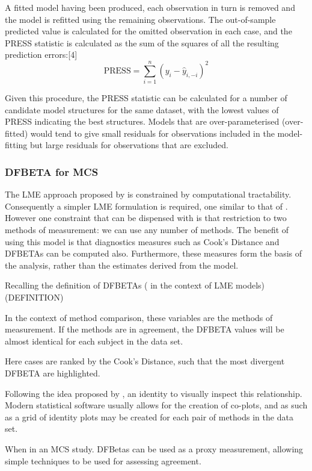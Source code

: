 \documentclass[12pt, a4paper]{report}
\theoremstyle{plain}
\theoremstyle{definition}
\theoremstyle{remark}
\begin{document}
	A fitted model having been produced, each observation in turn is removed and the model is refitted using the remaining observations. The out-of-sample predicted value is calculated for the omitted observation in each case, and the PRESS statistic is calculated as the sum of the squares of all the resulting prediction errors:[4]
	\[\mbox{PRESS} =\sum_{i=1}^n (y_i - \hat{y}_{i, -i})^2 \]

	Given this procedure, the PRESS statistic can be calculated for a number of candidate model structures for the same dataset, with the lowest values of PRESS indicating the best structures. Models that are over-parameterised (over-fitted) would tend to give small residuals for observations included in the model-fitting but large residuals for observations that are excluded.
	




	\subsubsection{DFBETA for MCS}
	The LME approach proposed by \citet{ARoy2009} is constrained by computational tractability.
	Consequently a simpler LME formulation is required, one similar to that of \citet{BXC2008}. However one constraint that can be dispensed with is that restriction to
	two methods of measurement: we can use any number of methods.
	The benefit of using this model is that diagnostics measures such as Cook's Distance and DFBETAs can be computed also. Furthermore, these measures
	form the basis of the analysis, rather than the estimates derived from the model.
	
	Recalling the definition of DFBETAs ( in the context of LME models) (DEFINITION)
	
	In the context of method comparison, these variables are the methods of measurement. If the methods are in agreement, the DFBETA values will be almost identical for each subject in
	the data set.
	
	Here cases are ranked by the Cook's Distance, such that the most divergent DFBETA are highlighted.
	
	
	
	Following the idea proposed by \citet{BA86}, an identity to visually inspect this relationship. Modern statistical software usually allows for the creation of co-plots, and as such as
	a grid of identity plots may be created for each pair of methods in the data set.
	
	
	When in an MCS study. DFBetas can be used as a proxy measurement, allowing simple techniques to be used for assessing agreement.
	
\end{document}
